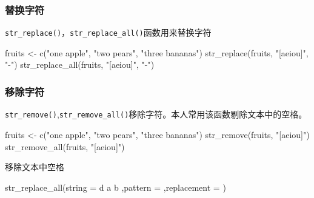 \documentclass[
]{book}
\newenvironment{Shaded}{\begin{snugshade}}{\end{snugshade}}
\newcommand{\AttributeTok}[1]{\textcolor[rgb]{0.77,0.63,0.00}{#1}}
\newcommand{\FunctionTok}[1]{\textcolor[rgb]{0.00,0.00,0.00}{#1}}
\newcommand{\NormalTok}[1]{#1}
\newcommand{\OtherTok}[1]{\textcolor[rgb]{0.56,0.35,0.01}{#1}}
\newcommand{\StringTok}[1]{\textcolor[rgb]{0.31,0.60,0.02}{#1}}
\begin{document}
\hypertarget{ux66ffux6362ux5b57ux7b26}{%
\subsubsection{替换字符}\label{ux66ffux6362ux5b57ux7b26}}

\texttt{str\_replace()}，\texttt{str\_replace\_all()}函数用来替换字符

\begin{Shaded}
\begin{Highlighting}[]
\NormalTok{fruits }\OtherTok{\textless{}{-}} \FunctionTok{c}\NormalTok{(}\StringTok{"one apple"}\NormalTok{, }\StringTok{"two pears"}\NormalTok{, }\StringTok{"three bananas"}\NormalTok{)}
\FunctionTok{str\_replace}\NormalTok{(fruits, }\StringTok{"[aeiou]"}\NormalTok{, }\StringTok{"{-}"}\NormalTok{)}
\FunctionTok{str\_replace\_all}\NormalTok{(fruits, }\StringTok{"[aeiou]"}\NormalTok{, }\StringTok{"{-}"}\NormalTok{)}
\end{Highlighting}
\end{Shaded}

\hypertarget{ux79fbux9664ux5b57ux7b26}{%
\subsubsection{移除字符}\label{ux79fbux9664ux5b57ux7b26}}

\texttt{str\_remove()},\texttt{str\_remove\_all()}移除字符。本人常用该函数剔除文本中的空格。

\begin{Shaded}
\begin{Highlighting}[]
\NormalTok{fruits }\OtherTok{\textless{}{-}} \FunctionTok{c}\NormalTok{(}\StringTok{"one apple"}\NormalTok{, }\StringTok{"two pears"}\NormalTok{, }\StringTok{"three bananas"}\NormalTok{)}
\FunctionTok{str\_remove}\NormalTok{(fruits, }\StringTok{"[aeiou]"}\NormalTok{)}
\FunctionTok{str\_remove\_all}\NormalTok{(fruits, }\StringTok{"[aeiou]"}\NormalTok{)}
\end{Highlighting}
\end{Shaded}

移除文本中空格

\begin{Shaded}
\begin{Highlighting}[]
\FunctionTok{str\_replace\_all}\NormalTok{(}\AttributeTok{string =} \StringTok{\textquotesingle{} d a  b \textquotesingle{}}\NormalTok{,}\AttributeTok{pattern =} \StringTok{\textquotesingle{} \textquotesingle{}}\NormalTok{,}\AttributeTok{replacement =} \StringTok{\textquotesingle{}\textquotesingle{}}\NormalTok{)}
\end{Highlighting}
\end{Shaded}
\end{document}
